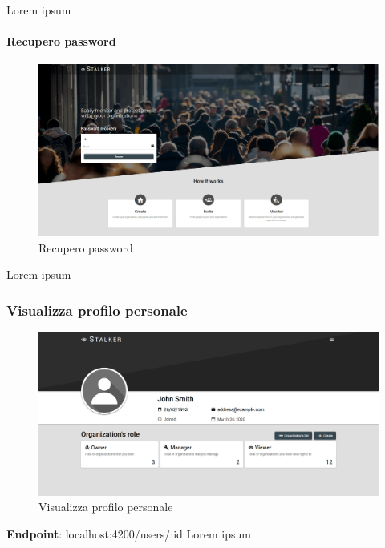 \documentclass[../manuale-utente.tex]{subfiles}
\begin{document}
Lorem ipsum

\paragraph{Recupero password}%
\label{par:recupero-password}

\begin{figure}[H]
    \centering
    \includegraphics{img/web-app/recupero-password.PNG}
    \caption{Recupero password}%
    \label{fig:web-app-recupero-password}
\end{figure}

Lorem ipsum

\subsubsection{Visualizza profilo personale}%
\label{subs:visualizza-profilo-personale}

\begin{figure}[H]
    \centering
    \includegraphics{img/web-app/visualizza-profilo-personale.PNG}
    \caption{Visualizza profilo personale}%
    \label{fig:web-app-visualizza-profilo-personale}
\end{figure}

\textbf{Endpoint}: localhost:4200/users/:id
Lorem ipsum
\end{document}

